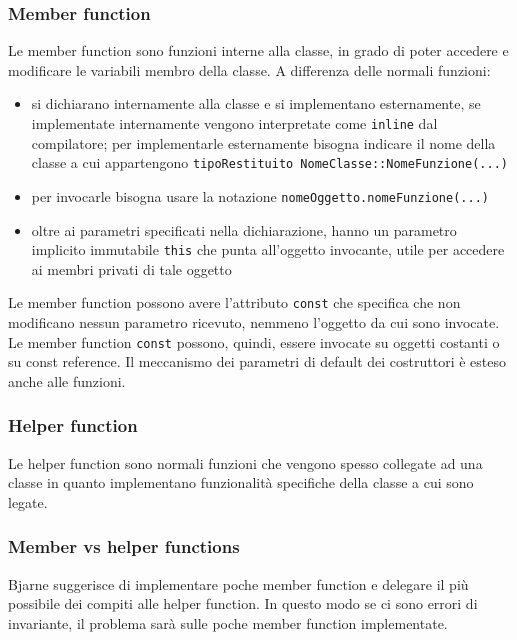 \documentclass[a4paper]{article}
\begin{document}
\subsubsection*{Member function}
Le member function sono funzioni interne alla classe, in grado di poter accedere e modificare le variabili membro della classe.
A differenza delle normali funzioni:
\begin{itemize}
	\item si dichiarano internamente alla classe e si implementano esternamente, se implementate internamente vengono interpretate
	come \verb|inline| dal compilatore; per implementarle esternamente bisogna indicare il nome della classe a cui appartengono
	\verb|tipoRestituito NomeClasse::NomeFunzione(...)|
	\item per invocarle bisogna usare la notazione \verb|nomeOggetto.nomeFunzione(...)|
	\item oltre ai parametri specificati nella dichiarazione, hanno un parametro implicito immutabile \verb|this| che punta
	all'oggetto invocante, utile per accedere ai membri privati di tale oggetto
\end{itemize}
Le member function possono avere l'attributo \verb|const| che specifica che non modificano nessun parametro ricevuto, nemmeno
l'oggetto da cui sono invocate. Le member function \verb|const| possono, quindi, essere invocate su oggetti costanti o su const
reference. Il meccanismo dei parametri di default dei costruttori è esteso anche alle funzioni.

\subsubsection*{Helper function}
Le helper function sono normali funzioni che vengono spesso collegate ad una classe in quanto implementano funzionalità specifiche
della classe a cui sono legate.

\subsubsection*{Member vs helper functions}
Bjarne suggerisce di implementare poche member function e delegare il più possibile dei compiti alle helper function. In questo
modo se ci sono errori di invariante, il problema sarà sulle poche member function implementate.

\newpage
\end{document}
